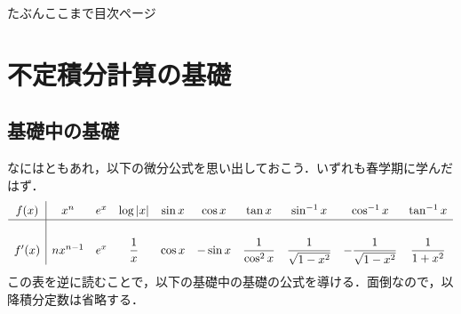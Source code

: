 \documentclass[10pt, uplatex, dvipdfmx]{jsarticle}
\theoremstyle{definition}
\numberwithin{equation}{section}
\begin{document}
たぶんここまで目次ページ

\newpage

\section{不定積分計算の基礎}

\subsection{基礎中の基礎}

なにはともあれ，以下の微分公式を思い出しておこう．いずれも春学期に学んだはず．
\[\renewcommand{\arraystretch}{1.3}
  \begin{array}[h]{c|ccccccccc}
    f(x) & x^n & e^x & \log|x| & \sin x & \cos x & \tan x & \sin^{-1}x & \cos ^{-1} x & \tan^{-1} x\\ \hline
    \\
    f'(x) & n x^{n-1} & e^x & \dfrac{1}{x} & \cos x & -\sin x & \dfrac{1}{\cos^2x} & \dfrac{1}{\sqrt{1-x^2}}
                                                                       & -\dfrac{1}{\sqrt{1-x^2}} & \dfrac{1}{1+x^2}
  \end{array}
\]
この表を逆に読むことで，以下の基礎中の基礎の公式を導ける．面倒なので，以降積分定数は省略する．

\vspace{1zh}
\end{document}
